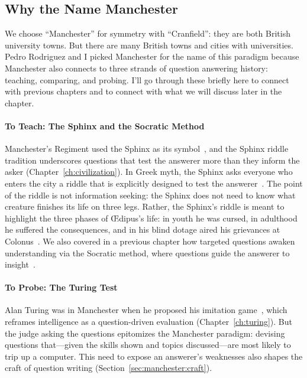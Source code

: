 \subsection{Why the Name Manchester}
\label{sec:manchester:why-name}

We choose ``Manchester'' for symmetry with ``Cranfield'': they are both
British university towns.
%
But there are many British towns and cities with universities.
%
Pedro Rodriguez and I picked Manchester for the name of this paradigm
because Manchester also connects to three strands of question answering
history: teaching, comparing, and probing.
%
I'll go through these briefly here to connect with previous chapters
and to connect with what we will discuss later in the chapter.

\paragraph{To Teach: The Sphinx and the Socratic Method}
Manchester's Regiment used the Sphinx as its symbol~\citep{farmer-01}, and the
Sphinx riddle tradition underscores questions that test the answerer more than
they inform the asker (Chapter~\ref{ch:civilization}).
In Greek myth, the Sphinx asks everyone who enters the city a riddle that is
explicitly designed to test the answerer~\citep{renger-13}.
%
The point of the
riddle is not information seeking: the Sphinx does not need to know what creature finishes its life on three legs.
%
Rather, the Sphinx's riddle is meant to highlight the three phases of
\OE{}dipus's life: in youth he was cursed, in adulthood he suffered the
consequences, and in his blind dotage aired his grievances at
Colonus~\citep{rado-62}.
%
We also covered in a previous chapter how targeted questions awaken
understanding via the Socratic method, where questions guide the
answerer to insight~\citep{trepanier-17}.


\paragraph{To Probe: The Turing Test}

Alan Turing was in Manchester when he proposed his imitation
game~\citep{manchester-turing-25}, which reframes intelligence as a
question-driven evaluation (Chapter~\ref{ch:turing}).
%
But the judge asking the questions epitomizes the Manchester paradigm:
devising questions that---given the skills shown and topics
discussed---are most likely to trip up a computer.
%
This need to expose an answerer's weaknesses also shapes the craft of
question writing (Section~\ref{sec:manchester:craft}).

